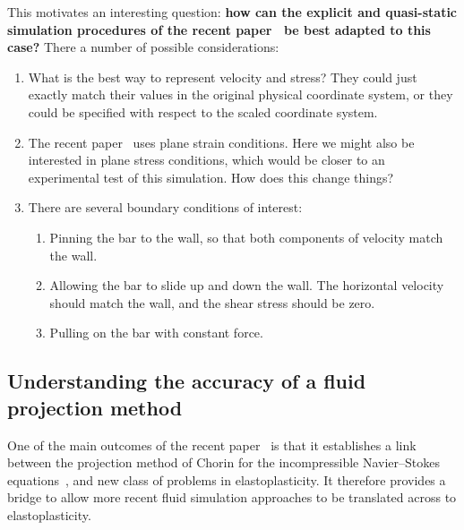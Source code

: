 \documentclass[12pt]{article}
\begin{document}
This motivates an interesting question: \textbf{how can the explicit and
quasi-static simulation procedures of the recent paper~\cite{rycroft15} be best
adapted to this case?} There a number of possible considerations:
\begin{enumerate}
  \item What is the best way to represent velocity and stress? They could
    just exactly match their values in the original physical coordinate
    system, or they could be specified with respect to the scaled coordinate
    system.
  \item The recent paper~\cite{rycroft15} uses plane strain conditions. Here
    we might also be interested in plane stress conditions, which would be
    closer to an experimental test of this simulation. How does this change
    things?
  \item There are several boundary conditions of interest:
    \begin{enumerate}
      \item Pinning the bar to the wall, so that both components of velocity
	match the wall.
      \item Allowing the bar to slide up and down the wall. The horizontal
	velocity should match the wall, and the shear stress should be zero.
      \item Pulling on the bar with constant force.
    \end{enumerate}
\end{enumerate}

\subsection*{Understanding the accuracy of a fluid projection method}
One of the main outcomes of the recent paper~\cite{rycroft15} is that it
establishes a link between the projection method of Chorin for the
incompressible Navier--Stokes equations~\cite{chorin68}, and new class of
problems in elastoplasticity. It therefore provides a bridge to allow
more recent fluid simulation approaches to be translated across to
elastoplasticity.
\end{document}
